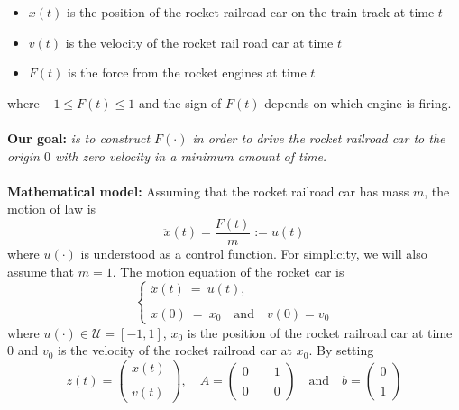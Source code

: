 \documentclass[letterpaper,12pt]{article}
\numberwithin{equation}{section}
\begin{document}
\begin{itemize}
\item  $x(t)$ is the position of the rocket railroad car on the train track at time $t$
\item  $v(t)$ is the velocity of the rocket rail road car at time $t$
\item  $F(t)$ is the force from the rocket engines at time $t$
\end{itemize} 
where $-1\leq F(t)\leq 1$ and the sign of $F(t)$ depends on which engine is firing.\\
\quad\\
\textbf{Our goal:} \textit{is to construct $F(\cdot)$ in order to drive the rocket railroad car to the origin $0$ with zero velocity in a minimum amount of time.} \\
\quad\\
\textbf{Mathematical model:} Assuming that the rocket railroad car has mass $m$, the motion of law is
\begin{equation}
\ddot{x}(t)=\frac{F(t)}{m}:=u(t)
\end{equation}
where $u(\cdot)$ is understood as a control function. For simplicity, we will also assume that $m=1$. The motion equation of the rocket car is
\begin{equation}\label{Rocket-car}
 \left\{\begin{array}{ll}
\ddot{x}(t)\: = \: u(t),\\
\\
x(0)  \: = \:  x_0\quad\mathrm{and}\quad v(0)=v_0
\end{array}\right.
\end{equation}
where $u(\cdot)\in\mathcal{U}=[-1,1]$, $x_0$ is the position of the rocket railroad car at time $0$ and $v_0$ is the velocity of the rocket railroad car at $x_0$. By setting
\begin{equation}
z(t)=
\begin{pmatrix}
x(t)\\
\\
v(t)
\end{pmatrix}
,\quad
A=
\begin{pmatrix}
0\qquad 1
\\
\\
0\qquad 0
\end{pmatrix}
\quad\mathrm{and}\quad
b=
\begin{pmatrix}
0
\\
\\
1
\end{pmatrix}
\end{equation}
\end{document}
